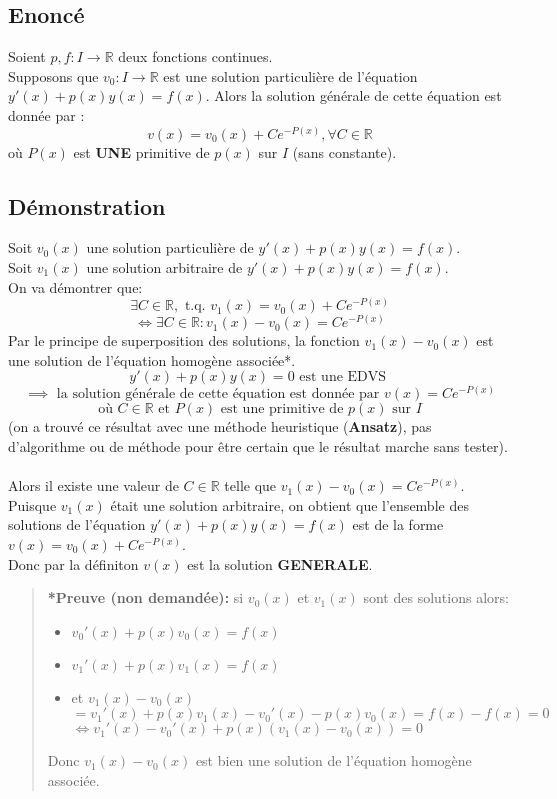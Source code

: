 \documentclass{article}
\begin{document}
\subsection{Enoncé}

Soient $ p, f : I \to \mathbb{R} $ deux fonctions continues.\\
Supposons que $ v_0 : I \to \mathbb{R} $ est une solution particulière de l'équation $ y'(x) + p(x)y(x) = f(x) $.
Alors la solution générale de cette équation est donnée par :
\[ v(x) = v_0(x) + Ce^{-P(x)}, \forall C \in \mathbb{R} \]
où $ P(x) $ est \textbf{UNE} primitive de $ p(x) $ sur $ I $ (sans constante).

\subsection{Démonstration}

Soit $ v_0(x) $ une solution particulière de $ y'(x) + p(x)y(x) = f(x). $\\
Soit $ v_1(x) $ une solution arbitraire de $ y'(x) + p(x)y(x) = f(x) $.\\
On va démontrer que:
\[ \exists C \in \mathbb{R}, \text{ t.q. } v_1(x) = v_0(x) + Ce^{-P(x)} \]
\[ \Leftrightarrow \exists C \in \mathbb{R} : v_1(x) - v_0(x) = Ce^{-P(x)} \]
Par le principe de superposition des solutions, la fonction $ v_1(x) - v_0(x) $ est une solution de l'équation homogène associée*.
\[ y'(x) + p(x)y(x) = 0 \text{ est une EDVS } \]
\[ \implies \text{ la solution générale de cette équation est donnée par } v(x) = Ce^{-P(x)} \]
\[ \text{où }C \in \mathbb{R} \text{ et } P(x) \text{ est une primitive de } p(x) \text{ sur } I \]
(on a trouvé ce résultat avec une méthode heuristique (\textbf{Ansatz}), pas d'algorithme ou de méthode pour être certain que le résultat marche sans tester).\\\\
Alors il existe une valeur de $ C \in \mathbb{R} $ telle que $ v_1(x) - v_0(x) = Ce^{-P(x)} $. Puisque $ v_1(x) $ était une solution arbitraire, on obtient que l'ensemble des solutions de l'équation $ y'(x) + p(x)y(x) = f(x) $ est de la forme $ v(x) = v_0(x) + Ce^{-P(x)} $.\\
Donc par la définiton $ v(x) $ est la solution \textbf{GENERALE}.

\begin{quote}
    \textbf{*Preuve (non demandée): } si $ v_0(x) $ et $ v_1(x) $ sont des solutions alors:
    \begin{itemize}
        \item $ v_0'(x) + p(x)v_0(x) = f(x) $
        \item $ v_1'(x) + p(x)v_1(x) = f(x) $
        \item et $ v_1(x) - v_0(x) $\\$ = v_1'(x) + p(x)v_1(x) - v_0'(x) - p(x)v_0(x) = f(x) - f(x) = 0 $\\ $ \Leftrightarrow v_1'(x) - v_0'(x) + p(x)(v_1(x) - v_0(x)) = 0$
    \end{itemize}
    Donc $ v_1(x) - v_0(x) $ est bien une solution de l'équation homogène associée.
\end{quote}
\end{document}
